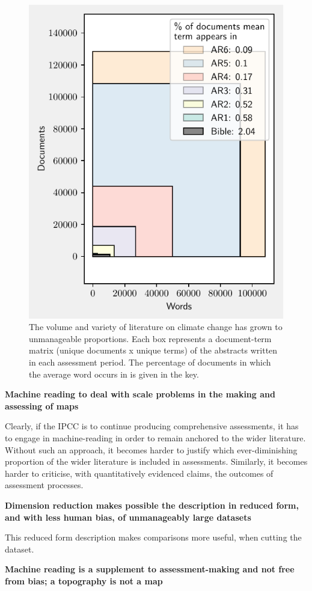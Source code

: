 \documentclass{article}
\begin{document}
\begin{linenumbers}
\begin{figure}
	\begin{center}
		\includegraphics[width=0.5\linewidth]{plots/literature_size/volume_variety.pdf}
		\caption{The volume and variety of literature on climate change has grown to unmanageable proportions. Each box represents a document-term matrix (unique documents x unique terms) of the abstracts written in each assessment period. The percentage of documents in which the average word occurs in is given in the key.
		}
		\label{growth}
	\end{center}
\end{figure}


\bigskip
\noindent\textbf{Machine reading to deal with scale problems in the making and assessing of maps}
	

Clearly, if the IPCC is to continue producing comprehensive assessments, it has to engage in machine-reading in order to remain anchored to the wider literature. Without such an approach, it becomes harder to justify which ever-diminishing proportion of the wider literature is included in assessments. Similarly, it becomes harder to criticise, with quantitatively evidenced claims, the outcomes of assessment processes.


\bigskip
\noindent\textbf{Dimension reduction makes possible the description in reduced form, and with less human bias, of unmanageably large datasets}

\citep{Greene2016} \citep{Lee1999}

This reduced form description makes comparisons more useful, when cutting the dataset.

\bigskip
\noindent\textbf{Machine reading is a supplement to assessment-making and not free from bias; a topography is not a map}


\end{linenumbers}
\end{document}
